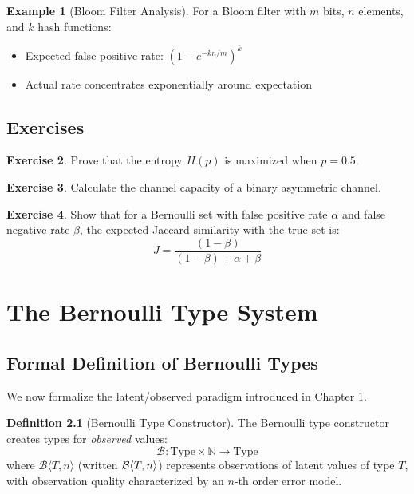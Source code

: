 \documentclass[11pt,twoside,openright]{book}
\theoremstyle{definition}
\newtheorem{definition}{Definition}[chapter]
\newtheorem{example}[definition]{Example}
\newtheorem{exercise}[definition]{Exercise}
\theoremstyle{plain}
\theoremstyle{remark}
\begin{document}
\begin{example}[Bloom Filter Analysis]
For a Bloom filter with $m$ bits, $n$ elements, and $k$ hash functions:
\begin{itemize}
    \item Expected false positive rate: $(1 - e^{-kn/m})^k$
    \item Actual rate concentrates exponentially around expectation
\end{itemize}
\end{example}

\section{Exercises}

\begin{exercise}
Prove that the entropy $H(p)$ is maximized when $p = 0.5$.
\end{exercise}

\begin{exercise}
Calculate the channel capacity of a binary asymmetric channel.
\end{exercise}

\begin{exercise}
Show that for a Bernoulli set with false positive rate $\alpha$ and false negative rate $\beta$, the expected Jaccard similarity with the true set is:
\begin{equation}
J = \frac{(1-\beta)}{(1-\beta) + \alpha + \beta}
\end{equation}
\end{exercise}

\chapter{The Bernoulli Type System}
\label{ch:type-system}

\section{Formal Definition of Bernoulli Types}

We now formalize the latent/observed paradigm introduced in Chapter 1.

\begin{definition}[Bernoulli Type Constructor]
The Bernoulli type constructor creates types for \emph{observed} values:
\begin{equation}
\mathcal{B}: \text{Type} \times \mathbb{N} \to \text{Type}
\end{equation}
where $\mathcal{B}\langle T, n \rangle$ (written $\mathcal{B}\langle T, n \rangle$) represents observations of latent values of type $T$, with observation quality characterized by an $n$-th order error model.
\end{definition}
\end{document}
